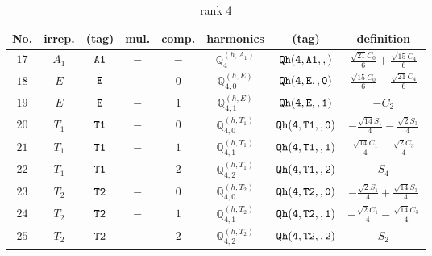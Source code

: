 \documentclass[fleqn,8pt]{jsarticle}
\begin{document}
\begin{table}[ht!]
\begin{center}
\caption{rank 4}
\renewcommand{\arraystretch}{1.3}
\begin{tabular}{cccccccc} \hline \hline
No. & irrep. & (tag) & mul. & comp. & harmonics & (tag) & definition \\ \hline
$ 17 $ & $ A_{1} $ & $ {\tt A1} $ & $ - $ & $ - $ & $ \mathbb{Q}_{4}^{(h,A_{1})} $ & $ {\tt Qh(4,A1,,)} $ & $ \frac{\sqrt{21} C_{0}}{6} + \frac{\sqrt{15} C_{4}}{6} $ \\
$ 18 $ & $ E $ & $ {\tt E} $ & $ - $ & $ 0 $ & $ \mathbb{Q}_{4,0}^{(h,E)} $ & $ {\tt Qh(4,E,,0)} $ & $ \frac{\sqrt{15} C_{0}}{6} - \frac{\sqrt{21} C_{4}}{6} $ \\
$ 19 $ & $ E $ & $ {\tt E} $ & $ - $ & $ 1 $ & $ \mathbb{Q}_{4,1}^{(h,E)} $ & $ {\tt Qh(4,E,,1)} $ & $ - C_{2} $ \\
$ 20 $ & $ T_{1} $ & $ {\tt T1} $ & $ - $ & $ 0 $ & $ \mathbb{Q}_{4,0}^{(h,T_{1})} $ & $ {\tt Qh(4,T1,,0)} $ & $ - \frac{\sqrt{14} S_{1}}{4} - \frac{\sqrt{2} S_{3}}{4} $ \\
$ 21 $ & $ T_{1} $ & $ {\tt T1} $ & $ - $ & $ 1 $ & $ \mathbb{Q}_{4,1}^{(h,T_{1})} $ & $ {\tt Qh(4,T1,,1)} $ & $ \frac{\sqrt{14} C_{1}}{4} - \frac{\sqrt{2} C_{3}}{4} $ \\
$ 22 $ & $ T_{1} $ & $ {\tt T1} $ & $ - $ & $ 2 $ & $ \mathbb{Q}_{4,2}^{(h,T_{1})} $ & $ {\tt Qh(4,T1,,2)} $ & $ S_{4} $ \\
$ 23 $ & $ T_{2} $ & $ {\tt T2} $ & $ - $ & $ 0 $ & $ \mathbb{Q}_{4,0}^{(h,T_{2})} $ & $ {\tt Qh(4,T2,,0)} $ & $ - \frac{\sqrt{2} S_{1}}{4} + \frac{\sqrt{14} S_{3}}{4} $ \\
$ 24 $ & $ T_{2} $ & $ {\tt T2} $ & $ - $ & $ 1 $ & $ \mathbb{Q}_{4,1}^{(h,T_{2})} $ & $ {\tt Qh(4,T2,,1)} $ & $ - \frac{\sqrt{2} C_{1}}{4} - \frac{\sqrt{14} C_{3}}{4} $ \\
$ 25 $ & $ T_{2} $ & $ {\tt T2} $ & $ - $ & $ 2 $ & $ \mathbb{Q}_{4,2}^{(h,T_{2})} $ & $ {\tt Qh(4,T2,,2)} $ & $ S_{2} $ \\
 \hline \hline
\end{tabular}
\end{center}
\end{table}
\end{document}
